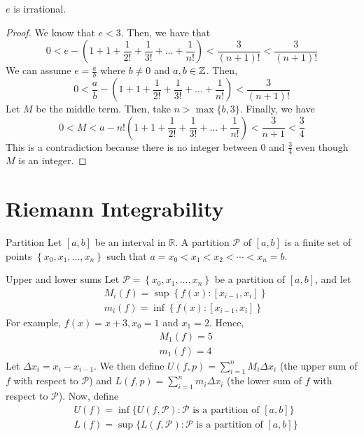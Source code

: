 \begin{theorem}{}{}
    $e$ is irrational.
\end{theorem}
\begin{proof}
    We know that $e < 3$. Then, we have that $$0 < e - \left(1 + 1 + \frac{1}{2!} + \frac{1}{3!} + \ldots + \frac{1}{n!}\right) < \frac{3}{(n + 1)!} < \frac{3}{(n + 1)!}$$
    We can assume $e = \frac{a}{b}$ where $b \neq 0$ and $a, b \in \mathbb{Z}$. Then, $$0 < \frac{a}{b} - \left(1 + 1 + \frac{1}{2!} + \frac{1}{3!} + \ldots + \frac{1}{n!}\right) < \frac{3}{(n+1)!}$$
    Let $M$ be the middle term. Then, take $n > \max\{b, 3\}$. Finally, we have $$0 < M < a - n!\left(1 + 1 + \frac{1}{2!} + \frac{1}{3!} + \ldots + \frac{1}{n!}\right) < \frac{3}{n + 1} < \frac{3}{4}$$
    This is a contradiction because there is no integer between 0 and $\frac{3}{4}$ even though $M$ is an integer.
\end{proof}


\section{Riemann Integrability}
\begin{definition}{Partition}{}
    Let $[a, b]$ be an interval in $\mathbb{R}$. A partition $\mathcal{P}$ of $[a, b]$ is a finite set of points $\left\{x_0, x_1, \ldots, x_n\right\}$ such that $a=x_0<x_1<x_2<\cdots<x_n=b$.
\end{definition}

\begin{definition}{Upper and lower sums}{}
    Let $\mathcal{P}=\left\{x_0, x_1, \ldots, x_n\right\}$ be a partition of $[a, b]$, and let
    \begin{align*}
        &M_i(f)=\sup \left\{f(x):\left[x_{i-1}, x_i\right]\right\} \\
        &m_i(f)=\inf \left\{f(x):\left[x_{i-1}, x_i\right]\right\}
    \end{align*}
    For example, $f(x)=x+3, x_0=1$ and $x_1=2$. Hence,
    \begin{align*}
        &M_1(f)=5 \\
        &m_1(f)=4
    \end{align*}
    Let $\Delta x_i=x_i-x_{i-1}$. We then define $U(f, p)=\sum_{i=1}^n M_i \Delta x_i$ (the upper sum of $f$ with respect to $\mathcal{P}$) and $L(f, p)=\sum_{i=1}^n m_i \Delta x_i$ (the lower sum of $f$ with respect to $\mathcal{P}$). Now, define
    \begin{align*}
        &U(f)=\inf \{U(f, \mathcal{P}): \mathcal{P} \text { is a partition of }[a, b]\} \\
        &L(f)=\sup \{L(f, \mathcal{P}): \mathcal{P} \text { is a partition of }[a, b]\}
    \end{align*}
\end{definition}


